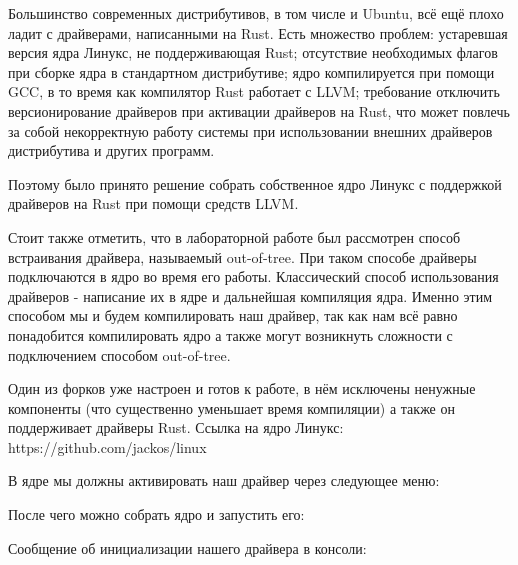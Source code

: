 \documentclass[a4paper,14pt]{extarticle}
\begin{document}
Большинство современных дистрибутивов, в том числе и Ubuntu, всё ещё плохо
ладит с драйверами, написанными на Rust. Есть множество проблем: устаревшая
версия ядра Линукс, не поддерживающая Rust; отсутствие необходимых флагов
при сборке ядра в стандартном дистрибутиве; ядро компилируется при помощи GCC,
в то время как компилятор Rust работает с LLVM; требование отключить версионирование
драйверов при активации драйверов на Rust, что может повлечь за собой некорректную
работу системы при использовании внешних драйверов дистрибутива и других программ.

Поэтому было принято решение собрать собственное ядро Линукс с поддержкой драйверов
на Rust при помощи средств LLVM. 

Стоит также отметить, что в лабораторной работе был рассмотрен способ встраивания 
драйвера, называемый out-of-tree. При таком способе драйверы подключаются в ядро 
во время его работы. Классический способ использования драйверов - написание их
в ядре и дальнейшая компиляция ядра. Именно этим способом мы и будем компилировать 
наш драйвер, так как нам всё равно понадобится компилировать ядро а также могут возникнуть
сложности с подключением способом out-of-tree. 

Один из форков уже настроен и готов к работе, в нём исключены ненужные компоненты (что
существенно уменьшает время компиляции) а также он поддерживает драйверы Rust. 
Ссылка на ядро Линукс: https://github.com/jackos/linux

В ядре мы должны активировать наш драйвер через следующее меню:

После чего можно собрать ядро и запустить его:


Сообщение об инициализации нашего драйвера в консоли:
\end{document}
